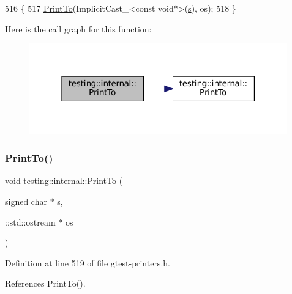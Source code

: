 \begin{DoxyCode}
516                                                           \{
517   \hyperlink{namespacetesting_1_1internal_af2c33928facbf2edf7af564278724d98}{PrintTo}(ImplicitCast\_<const void*>(\hyperlink{namespaceservice__node__3_aa976421a49e0b54f23833423400849ae}{s}), os);
518 \}
\end{DoxyCode}
Here is the call graph for this function\+:
\nopagebreak
\begin{figure}[H]
\begin{center}
\leavevmode
\includegraphics[width=316pt]{namespacetesting_1_1internal_a792cc5665a34619ed7a6d54711433456_cgraph}
\end{center}
\end{figure}
\mbox{\label{namespacetesting_1_1internal_a1320096b116f8cc4b688acbd5b783051}} 
\subsubsection{\texorpdfstring{Print\+To()}{PrintTo()}\hspace{0.1cm}{\footnotesize\ttfamily [13/20]}}
{\footnotesize\ttfamily void testing\+::internal\+::\+Print\+To (\begin{DoxyParamCaption}\item[{signed char $\ast$}]{s,  }\item[{\+::std\+::ostream $\ast$}]{os }\end{DoxyParamCaption})\hspace{0.3cm}{\ttfamily [inline]}}



Definition at line 519 of file gtest-\/printers.\+h.



References Print\+To().


